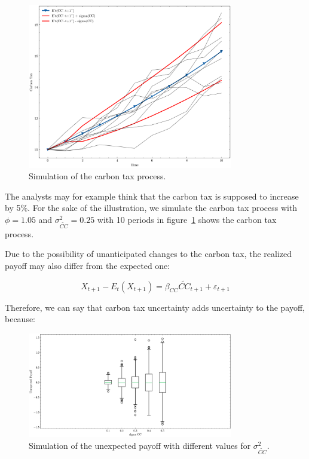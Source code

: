 \begin{figure}[htbp]
    \centering
    \includegraphics[width=0.8\textwidth]{../images/chapter01/carbon_tax_simulations.png}
    \caption{Simulation of the carbon tax process.}
    \label{fig:carbon_tax}
\end{figure}

The analysts may for example think that the carbon 
tax is supposed to increase by 5\%.
For the sake of the illustration, 
we simulate the carbon tax process with
$\phi = 1.05$ and $\sigma_{\tilde{CC}}^2 = 0.25$
with 10 periods
in figure~\ref{fig:carbon_tax} shows the carbon tax process.



Due to the possibility of unanticipated changes 
to the carbon tax,
the realized payoff may also differ from the expected one:

\begin{equation}
    X_{t+1} - E_{t}(X_{t+1}) = \beta_{CC} \tilde{CC}_{t+1} + \varepsilon_{t+1}
\end{equation}

Therefore, we can say that 
carbon tax uncertainty adds uncertainty to the
payoff, because:


\begin{figure}[htbp]
    \centering
    \includegraphics[width=0.8\textwidth]{../images/chapter01/unexpected_payoff_boxplot.png}
    \caption{Simulation of the unexpected payoff with different values for $\sigma_{\tilde{CC}}^2$.}
    \label{fig:payoff}
\end{figure}

